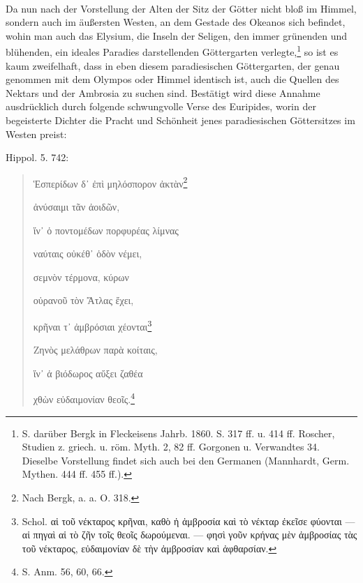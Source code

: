 \documentclass[a4paper, 11pt, oneside]{article}
\begin{document}
\paragraph{}
Da nun nach der Vorstellung der Alten der Sitz der Götter nicht bloß im Himmel, sondern auch im äußersten Westen, an dem Gestade des Okeanos sich befindet, wohin man auch das Elysium, die Inseln der Seligen, den immer grünenden und blühenden, ein ideales Paradies darstellenden Göttergarten verlegte,\footnote{S. darüber Bergk in Fleckeisens Jahrb. 1860. S. 317 ff. u. 414 ff. Roscher, Studien z. griech. u. röm. Myth. 2, 82 ff. Gorgonen u. Verwandtes 34. Dieselbe Vorstellung findet sich auch bei den Germanen (Mannhardt, Germ. Mythen. 444 ff. 455 ff.).} so ist es kaum zweifelhaft, dass in eben diesem paradiesischen Göttergarten, der genau genommen mit dem Olympos oder Himmel identisch ist, auch die Quellen des Nektars und der Ambrosia zu suchen sind. Bestätigt wird diese Annahme ausdrücklich durch folgende schwungvolle Verse des Euripides, worin der begeisterte Dichter die Pracht und Schönheit jenes paradiesischen Göttersitzes im Westen preist:

Hippol. 5. 742:
\begin{quotation}\large
Ἑσπερίδων δ᾽ ἐπὶ μηλόσπορον ἀκτὰν\footnote{Nach Bergk, a. a. O. 318.}

ἀνύσαιμι τᾶν ἀοιδῶν,

ἵν᾿ ὁ ποντομέδων πορφυρέας λίμνας

ναύταις οὐκέθ᾽ ὁδὸν νέμει,

σεμνὸν τέρμονα, κύρων

οὐρανοῦ τὸν Ἄτλας ἔχει,

κρῆναι τ᾽ ἀμβρόσιαι χέονται\footnote{Schol. αἱ τοῦ νέκταρος κρῆναι, καθὸ ἡ ἀμβροσία καὶ τὸ νέκταρ ἐκεῖσε φύονται --- αἱ πηγαὶ αἱ τὸ ζῆν τοῖς θεοῖς δωρούμεναι. --- φησὶ γοῦν κρήνας μὲν ἀμβροσίας τὰς τοῦ νέκταρος, εὐδαιμονίαν δὲ τὴν ἀμβροσίαν καὶ ἀφθαρσίαν.}

Ζηνὸς μελάθρων παρὰ κοίταις,

ἵν᾽ ἁ βιόδωρος αὔξει ζαθέα

χθὼν εὐδαιμονίαν θεοῖς.\footnote{S. Anm. 56, 60, 66.}
\end{quotation}
\end{document}
